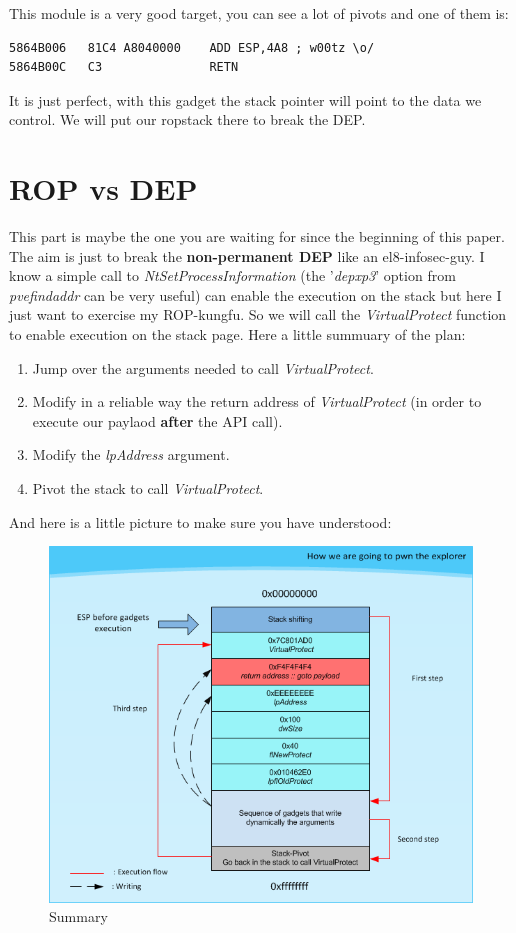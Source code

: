 \documentclass[12pt, titlepage]{article}
\begin{document}
This module is a very good target, you can see a lot of pivots and one of them is:
    \begin{lstlisting}
5864B006   81C4 A8040000    ADD ESP,4A8 ; w00tz \o/
5864B00C   C3               RETN
    \end{lstlisting}

It is just perfect, with this gadget the stack pointer will point to the data we control. We will put our ropstack there to break the DEP.

\section{ROP vs DEP}
This part is maybe the one you are waiting for since the beginning of this paper. The aim is just to break the \textbf{non-permanent DEP} like an el8-infosec-guy. I know a simple call to \emph{NtSetProcessInformation} (the '\emph{depxp3}' option from \emph{pvefindaddr} can be very useful) can enable the execution on the stack but here I just want to exercise my ROP-kungfu. So we will call the \emph{VirtualProtect} function to enable execution on the stack page. Here a little summuary of the plan:
\begin{enumerate}
  \item Jump over the arguments needed to call \emph{VirtualProtect}.
  \item Modify in a reliable way the return address of \emph{VirtualProtect} (in order to execute our paylaod \textbf{after} the API call).
  \item Modify the \emph{lpAddress} argument.
  \item Pivot the stack to call \emph{VirtualProtect}.
\end{enumerate}

And here is a little picture to make sure you have understood:
\begin{figure}[H]
  \includegraphics{pics/stack-shift-ret.png}
  \caption{Summary}
  \label{Summary}
\end{figure}
\end{document}
